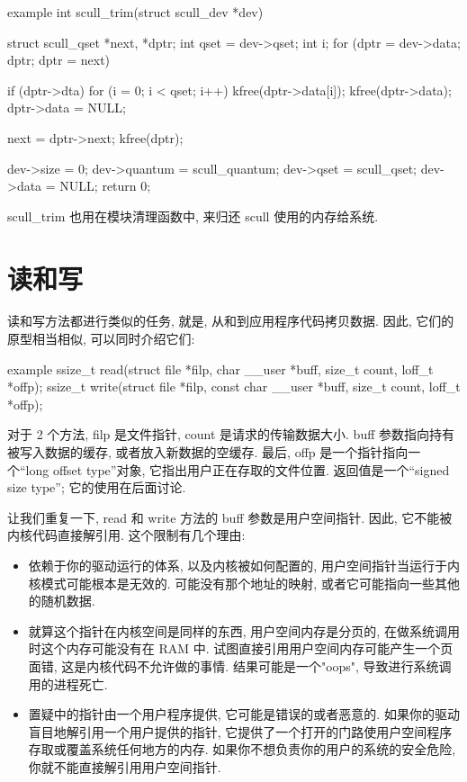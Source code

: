 \documentclass[lang=cn,newtx,10pt,scheme=chinese]{elegantbook}
\begin{document}
\begin{mycode}{example}
int scull_trim(struct scull_dev *dev) {
    struct scull_qset *next, *dptr;
    int qset = dev->qset;
    int i;
    for (dptr = dev->data; dptr; dptr = next) {
        if (dptr->dta) {
            for (i = 0; i < qset; i++) {
                kfree(dptr->data[i]);
            }
            kfree(dptr->data);
            dptr->data = NULL;
        }

        next = dptr->next;
        kfree(dptr);
    }

    dev->size = 0;
    dev->quantum = scull_quantum;
    dev->qset = scull_qset;
    dev->data = NULL;
    return 0;
}
\end{mycode}

scull\_trim 也用在模块清理函数中, 来归还 scull 使用的内存给系统.

\section{读和写}

读和写方法都进行类似的任务, 就是, 从和到应用程序代码拷贝数据. 因此, 它们的原型相当相似, 可以同时介绍它们:

\begin{mycode}{example}
ssize_t read(struct file *filp, char __user *buff, size_t count, loff_t *offp);
ssize_t write(struct file *filp, const char __user *buff, size_t count, loff_t *offp);
\end{mycode}

对于 2 个方法, filp 是文件指针, count 是请求的传输数据大小. buff 参数指向持有被写入数据的缓存, 或者放入新数据的空缓存. 最后, offp 是一个指针指向一个``long offset type''对象, 它指出用户正在存取的文件位置. 返回值是一个``signed size type''; 它的使用在后面讨论.

让我们重复一下, read 和 write 方法的 buff 参数是用户空间指针. 因此, 它不能被内核代码直接解引用. 这个限制有几个理由:

\begin{itemize}
    \item 依赖于你的驱动运行的体系, 以及内核被如何配置的, 用户空间指针当运行于内核模式可能根本是无效的. 可能没有那个地址的映射, 或者它可能指向一些其他的随机数据.
    \item 就算这个指针在内核空间是同样的东西, 用户空间内存是分页的, 在做系统调用时这个内存可能没有在 RAM 中. 试图直接引用用户空间内存可能产生一个页面错, 这是内核代码不允许做的事情. 结果可能是一个"oops", 导致进行系统调用的进程死亡.
    \item 置疑中的指针由一个用户程序提供, 它可能是错误的或者恶意的. 如果你的驱动盲目地解引用一个用户提供的指针, 它提供了一个打开的门路使用户空间程序存取或覆盖系统任何地方的内存. 如果你不想负责你的用户的系统的安全危险, 你就不能直接解引用用户空间指针.
\end{itemize}
\end{document}
